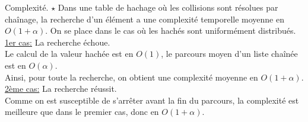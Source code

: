 \documentclass[french, 11pt]{article}
\begin{document}
\begin{thm}{Complexité. $\star$}{}
    Dans une table de hachage où les collisions sont résolues par chaînage, la recherche d'un élément a une complexité temporelle moyenne en $O(1+\alpha)$.
    \tcblower
    On se place dans le cas où les hachés sont uniformément distribués.\\
    \underline{1er cas:} La recherche échoue.\\
    Le calcul de la valeur hachée est en $O(1)$, le parcours moyen d'un liste chaînée est en $O(\alpha)$.\\
    Ainsi, pour toute la recherche, on obtient une complexité moyenne en $O(1+\alpha)$.\n
    \underline{2ème cas:} La recherche réussit.\\
    Comme on est susceptible de s'arrêter avant la fin du parcours, la complexité est meilleure que dans le premier cas, donc en $O(1+\alpha)$.
\end{thm}
\end{document}
